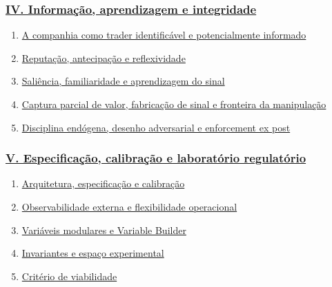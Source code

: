 \documentclass[
  a4paper,
]{article}
\providecommand{\tightlist}{%
  \setlength{\itemsep}{0pt}\setlength{\parskip}{0pt}}
\begin{document}
\hypertarget{iv-informauxe7uxe3o-aprendizagem-e-integridade}{%
\subsubsection{\texorpdfstring{\protect\hyperlink{iv-informacao-aprendizagem-e-integridade}{IV.
Informação, aprendizagem e
integridade}}{IV. Informação, aprendizagem e integridade}}\label{iv-informauxe7uxe3o-aprendizagem-e-integridade}}

\begin{enumerate}
\def\labelenumi{\arabic{enumi}.}
\setcounter{enumi}{18}
\tightlist
\item
  \protect\hyperlink{19-a-companhia-como-trader-identificavel-e-potencialmente-informado}{A
  companhia como trader identificável e potencialmente informado}
\item
  \protect\hyperlink{20-reputacao-antecipacao-e-reflexividade}{Reputação,
  antecipação e reflexividade}
\item
  \protect\hyperlink{21-o-risco-de-o-sinal-quebrar-o-mercado}{Saliência,
  familiaridade e aprendizagem do sinal}
\item
  \protect\hyperlink{22-manipulacao-gross-e-transferencia-de-valor-a-terceiros}{Captura
  parcial de valor, fabricação de sinal e fronteira da manipulação}
\item
  \protect\hyperlink{23-disciplina-endogena-e-enforcement-ex-post}{Disciplina
  endógena, desenho adversarial e enforcement ex post}
\end{enumerate}

\hypertarget{v-especificauxe7uxe3o-calibrauxe7uxe3o-e-laboratuxf3rio-regulatuxf3rio}{%
\subsubsection{\texorpdfstring{\protect\hyperlink{v-especificacao-calibracao-e-laboratorio-regulatorio}{V.
Especificação, calibração e laboratório
regulatório}}{V. Especificação, calibração e laboratório regulatório}}\label{v-especificauxe7uxe3o-calibrauxe7uxe3o-e-laboratuxf3rio-regulatuxf3rio}}

\begin{enumerate}
\def\labelenumi{\arabic{enumi}.}
\setcounter{enumi}{23}
\tightlist
\item
  \protect\hyperlink{24-arquitetura-especificacao-e-calibracao}{Arquitetura,
  especificação e calibração}
\item
  \protect\hyperlink{25-observabilidade-externa-e-flexibilidade-operacional}{Observabilidade
  externa e flexibilidade operacional}
\item
  \protect\hyperlink{26-variaveis-modulares-e-variable-builder}{Variáveis
  modulares e Variable Builder}
\item
  \protect\hyperlink{27-invariantes-e-espaco-experimental}{Invariantes e
  espaço experimental}
\item
  \protect\hyperlink{28-criterio-de-viabilidade}{Critério de
  viabilidade}
\end{enumerate}
\end{document}
